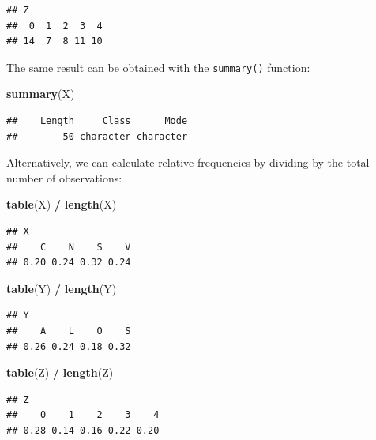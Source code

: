 \documentclass[
]{article}
\newenvironment{Shaded}{\begin{snugshade}}{\end{snugshade}}
\newcommand{\FunctionTok}[1]{\textcolor[rgb]{0.13,0.29,0.53}{\textbf{#1}}}
\newcommand{\NormalTok}[1]{#1}
\newcommand{\SpecialCharTok}[1]{\textcolor[rgb]{0.81,0.36,0.00}{\textbf{#1}}}
\begin{document}
\begin{verbatim}
## Z
##  0  1  2  3  4 
## 14  7  8 11 10
\end{verbatim}

The same result can be obtained with the \texttt{summary()} function:

\begin{Shaded}
\begin{Highlighting}[]
\FunctionTok{summary}\NormalTok{(X)}
\end{Highlighting}
\end{Shaded}

\begin{verbatim}
##    Length     Class      Mode 
##        50 character character
\end{verbatim}

Alternatively, we can calculate relative frequencies by dividing by the
total number of observations:

\begin{Shaded}
\begin{Highlighting}[]
\FunctionTok{table}\NormalTok{(X) }\SpecialCharTok{/} \FunctionTok{length}\NormalTok{(X)}
\end{Highlighting}
\end{Shaded}

\begin{verbatim}
## X
##    C    N    S    V 
## 0.20 0.24 0.32 0.24
\end{verbatim}

\begin{Shaded}
\begin{Highlighting}[]
\FunctionTok{table}\NormalTok{(Y) }\SpecialCharTok{/} \FunctionTok{length}\NormalTok{(Y)}
\end{Highlighting}
\end{Shaded}

\begin{verbatim}
## Y
##    A    L    O    S 
## 0.26 0.24 0.18 0.32
\end{verbatim}

\begin{Shaded}
\begin{Highlighting}[]
\FunctionTok{table}\NormalTok{(Z) }\SpecialCharTok{/} \FunctionTok{length}\NormalTok{(Z)}
\end{Highlighting}
\end{Shaded}

\begin{verbatim}
## Z
##    0    1    2    3    4 
## 0.28 0.14 0.16 0.22 0.20
\end{verbatim}
\end{document}
